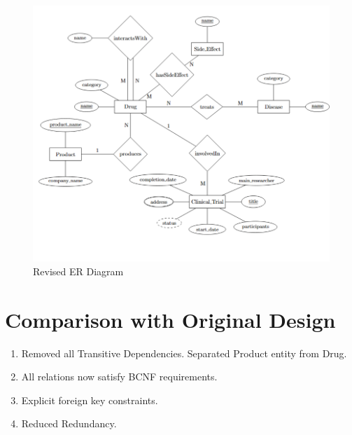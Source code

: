 \documentclass[12pt,a4paper]{article}
\begin{document}
\begin{figure}[htbp]
    \centering
    \includegraphics[width=1\textwidth]{er2.png}
    \caption{Revised ER Diagram}
    \label{fig:revised_er_diagram}
\end{figure}

\newpage
\section{Comparison with Original Design}

\begin{enumerate}
    \item Removed all Transitive Dependencies. Separated Product entity from Drug.
    \item All relations now satisfy BCNF requirements.
    \item Explicit foreign key constraints.
    \item Reduced Redundancy.

\end{enumerate}
\end{document}
